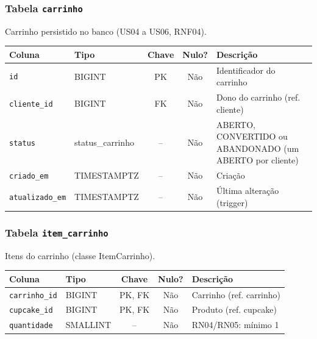 \subsubsection{Tabela \texttt{carrinho}}
\noindent Carrinho persistido no banco (US04 a US06, RNF04).\par\smallskip
\begingroup\footnotesize\renewcommand{\arraystretch}{1.2}
\begin{longtable}{|p{3.0cm}|p{2.6cm}|c|c|p{5.6cm}|}
\hline
\rowcolor{gray!40}\textbf{Coluna} & \textbf{Tipo} & \textbf{Chave} & \textbf{Nulo?} & \textbf{Descrição} \\ \hline
\endhead
\texttt{id} & BIGINT & PK & Não & Identificador do carrinho \\ \hline
\texttt{cliente\_id} & BIGINT & FK & Não & Dono do carrinho (ref. cliente) \\ \hline
\texttt{status} & status\_carrinho & -- & Não & ABERTO, CONVERTIDO ou ABANDONADO (um ABERTO por cliente) \\ \hline
\texttt{criado\_em} & TIMESTAMPTZ & -- & Não & Criação \\ \hline
\texttt{atualizado\_em} & TIMESTAMPTZ & -- & Não & Última alteração (trigger) \\ \hline
\end{longtable}
\endgroup
\subsubsection{Tabela \texttt{item\_carrinho}}
\noindent Itens do carrinho (classe ItemCarrinho).\par\smallskip
\begingroup\footnotesize\renewcommand{\arraystretch}{1.2}
\begin{longtable}{|p{3.0cm}|p{2.6cm}|c|c|p{5.6cm}|}
\hline
\rowcolor{gray!40}\textbf{Coluna} & \textbf{Tipo} & \textbf{Chave} & \textbf{Nulo?} & \textbf{Descrição} \\ \hline
\endhead
\texttt{carrinho\_id} & BIGINT & PK, FK & Não & Carrinho (ref. carrinho) \\ \hline
\texttt{cupcake\_id} & BIGINT & PK, FK & Não & Produto (ref. cupcake) \\ \hline
\texttt{quantidade} & SMALLINT & -- & Não & RN04/RN05: mínimo 1 \\ \hline
\end{longtable}
\endgroup
